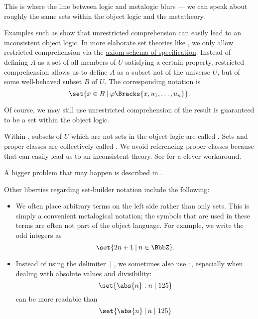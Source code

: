 \begin{definition}
  This is where the line between logic and metalogic blurs --- we can speak about roughly the same sets within the object logic and the metatheory.

  Examples such as  show that unrestricted comprehension can easily lead to an inconsistent object logic. In more elaborate set theories like \hyperref[def:zfc]{}, we only allow restricted comprehension via the \hyperref[def:zfc/specification]{axiom schema of specification}. Instead of defining \( A \) as a set of all members of \( U \) satisfying a certain property, restricted comprehension allows us to define \( A \) as a subset not of the universe \( U \), but of some well-behaved subset \( B \) of \( U \). The corresponding notation is
  \begin{equation*}
    \set{ x \in B \given \varphi\Bracks{x, u_1, \ldots, u_n} }.
  \end{equation*}

  Of course, we may still use unrestricted comprehension of the result is guaranteed to be a set within the object logic.

  Within , subsets of \( U \) which are not sets in the object logic are called . Sets and proper classes are collectively called . We avoid referencing proper classes because that can easily lead us to an inconsistent theory. See  for a clever workaround.

  A bigger problem that may happen is described in .

  Other liberties regarding set-builder notation include the following:
  \begin{itemize}
    \item We often place arbitrary terms on the left side rather than only sets. This is simply a convenient metalogical notation; the symbols that are used in these terms are often not part of the object language. For example, we write the odd integers as
    \begin{equation*}
      \set{ 2n + 1 \given n \in \BbbZ }.
    \end{equation*}

    \item Instead of using the delimiter \( \given \), we sometimes also use \( : \), especially when dealing with absolute values and divisibility:
    \begin{equation*}
      \set{ \abs{n} : n \mid 125 }
    \end{equation*}
    can be more readable than
    \begin{equation*}
      \set{ \abs{n} \given n \mid 125 }
    \end{equation*}


\end{itemize}
\end{definition}
